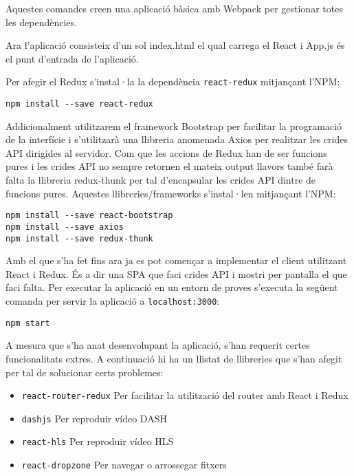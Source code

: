 \documentclass[12pt, titlepage]{article}
\begin{document}
Aquestes comandes creen una aplicació bàsica amb Webpack per gestionar totes les
dependències.

Ara l'aplicació consisteix d'un sol index.html el qual carrega el React i App.js
és el punt d'entrada de l'aplicació.

Per afegir el Redux s'instal·la la dependència \verb|react-redux| mitjançant l'NPM:
\begin{lstlisting}[breaklines]
npm install --save react-redux
\end{lstlisting}

Addicionalment utilitzarem el framework Bootstrap per facilitar la programació
de la interfície i s'utilitzarà una llibreria anomenada Axios per realitzar les
crides API dirigides al servidor. Com que les accions de Redux han de ser
funcions pures i les crides API no sempre retornen el mateix output llavors
també farà falta la llibreria redux-thunk per tal d'encapsular les crides API
dintre de funcions pures. Aquestes llibreries/frameworks s'instal·len mitjançant
l'NPM:

\begin{lstlisting}[breaklines]
npm install --save react-bootstrap
npm install --save axios
npm install --save redux-thunk
\end{lstlisting}

Amb el que s'ha fet fins ara ja es pot començar a implementar el client utilitzant
React i Redux. És a dir una SPA que faci crides API i mostri per pantalla el que
faci falta. Per executar la aplicació en un entorn de proves s'executa la següent
comanda per servir la aplicació a \verb|localhost:3000|:

\begin{lstlisting}
npm start
\end{lstlisting}

A mesura que s'ha anat desenvolupant la aplicació, s'han
requerit certes funcionalitats extres. A
continuació hi ha un llistat de llibreries que s'han afegit per tal de solucionar
certs problemes:

\begin{itemize}
\item \verb|react-router-redux| Per facilitar la utilització del router amb React
i Redux
\item \verb|dashjs| Per reproduir vídeo DASH
\item \verb|react-hls| Per reproduir vídeo HLS
\item \verb|react-dropzone| Per navegar o arrossegar fitxers
\end{itemize}
\end{document}
